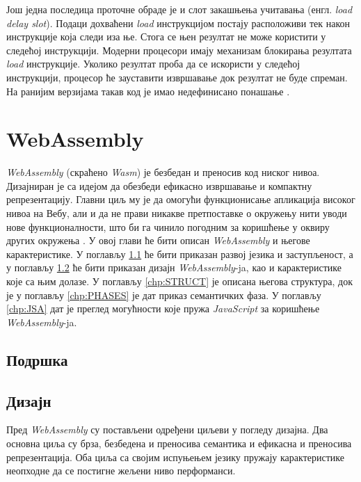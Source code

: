 \documentclass[12pt,oneside]{memoir}
\begin{document}
Још једна последица проточне обраде је и слот закашњења учитавања (енгл. \textit{load delay slot}). Подаци дохваћени
\textit{load} инструкцијом постају расположиви тек након инструкције која следи иза ње. Стога се њен резултат не
може користити у следећој инструкцији. Модерни процесори имају механизам блокирања резултата \textit{load}
инструкције. Уколико резултат проба да се искористи у следећој инструкцији, процесор ће зауставити извршавање док
резултат не буде спреман. На ранијим верзијама такав код је имао недефинисано понашање \cite{SMR}.


\chapter{WebAssembly}

\textit{WebAssembly} (скраћено \textit{Wasm}) је безбедан и преносив код ниског нивоа. Дизајниран је са
идејом да обезбеди ефикасно извршавање и компактну репрезентацију. Главни циљ му је да омогући функционисање
апликација високог нивоа на Вебу, али и да не прави никакве претпоставке о окружењу нити уводи нове функционалности,
што би га чинило погодним за коришћење у оквиру других окружења \cite{WASMS}. У овој глави ће бити описан
\textit{WebAssembly} и његове карактеристике. У поглављу \ref{chp:SUPP} ће бити приказан развој језика и заступљеност, а
у поглављу \ref{chp:DESIGN} ће бити приказан дизајн \textit{WebAssembly}-ja, као и карактеристике које са њим долазе.
У поглављу \ref{chp:STRUCT} је описана његова структура, док је у поглављу \ref{chp:PHASES} је дат приказ семантичких
фаза. У поглављу \ref{chp:JSA} дат је преглед могућности које пружа \textit{JavaScript} за коришћење
\textit{WebAssembly}-ja.

\section{Подршка} \label{chp:SUPP}



\section{Дизајн} \label{chp:DESIGN}

Пред \textit{WebAssembly} су постављени одређени циљеви у погледу дизајна. Два основна циља су брза, безбедена и
преносива семантика и ефикасна и преносива репрезентација. Оба циља са својим испуњењем језику пружају
карактеристике неопходне да се постигне жељени ниво перформанси.
\end{document}
